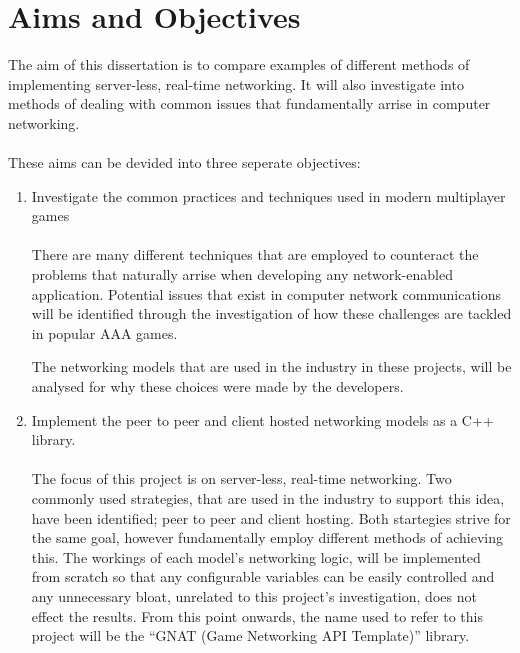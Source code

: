 \section{Aims and Objectives}
The aim of this dissertation is to compare examples of different methods of implementing server-less, real-time networking. It will also investigate into methods of dealing with common issues that fundamentally arrise in computer networking.
\\\\
These aims can be devided into three seperate objectives:
\begin{enumerate}
\item Investigate the common practices and techniques used in modern multiplayer games
  \\\\
  There are many different techniques that are employed to counteract the problems that naturally arrise when developing any network-enabled application. Potential issues that exist in computer network communications will be identified through the investigation of how these challenges are tackled in popular AAA games.

  The networking models that are used in the industry in these projects, will be analysed for why these choices were made by the developers.


\item Implement the peer to peer and client hosted networking models as a C++ library.
  \\\\
  The focus of this project is on server-less, real-time networking. Two commonly used strategies, that are used in the industry to support this idea, have been identified; peer to peer and client hosting. Both startegies strive for the same goal, however fundamentally employ different methods of achieving this.
  The workings of each model's networking logic, will be implemented from scratch so that any configurable variables can be easily controlled and any unnecessary bloat, unrelated to this project's investigation, does not effect the results.
  From this point onwards, the name used to refer to this project will be the ``GNAT (Game Networking API Template)'' library.


\end{enumerate}
